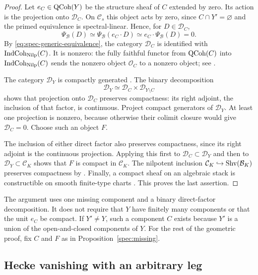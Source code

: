 \begin{proof}
Let $e_C\in\operatorname{QCoh}(Y)$ be the structure sheaf of $C$ extended by zero.
Its action is the projection onto $\mathcal D_C$.  On $\mathcal C_s$ this
object acts by zero, since $C\cap Y'=\varnothing$ and the primed equivalence
is spectral-linear.  Hence, for $D\in\mathcal D_C$,
\[
 \Psi_{\mathcal B}(D)
 \simeq\Psi_{\mathcal B}(e_C\cdot D)
 \simeq e_C\cdot\Psi_{\mathcal B}(D)=0.
\]
By \eqref{eq:spec-generic-equivalence}, the category $\mathcal D_C$ is
identified with $\operatorname{IndCoh}_{\operatorname{Nilp}}(C)$.  It is nonzero: the fully faithful
functor from $\operatorname{QCoh}(C)$ into $\operatorname{IndCoh}_{\operatorname{Nilp}}(C)$ sends the nonzero object
$\mathcal O_C$ to a nonzero object; see \cite[\S\S1.3.1--1.3.4]{GR}.

The category $\mathcal D_Y$ is compactly generated
\cite[\S3.1.7]{GR}.  The binary decomposition
\[
 \mathcal D_Y\simeq\mathcal D_C\times\mathcal D_{Y\setminus C}
\]
shows that projection onto $\mathcal D_C$ preserves compactness: its right
adjoint, the inclusion of that factor, is continuous.  Project compact
generators of $\mathcal D_Y$.  At least one projection is nonzero, because
otherwise their colimit closure would give $\mathcal D_C=0$.  Choose such
an object $F$.

The inclusion of either direct factor also preserves compactness, since
its right adjoint is the continuous projection.  Applying this first to
$\mathcal D_C\subset\mathcal D_Y$ and then to
$\mathcal D_Y\subset\mathcal C_K$ shows that $F$ is compact in
$\mathcal C_K$.  The nilpotent inclusion
$\mathcal C_K\hookrightarrow\operatorname{Shv}(\mathcal B_K)$ preserves compactness by
\cite[Theorem~1.1.7]{GR}.  Finally, a compact sheaf on an algebraic stack
is constructible on smooth finite-type charts
\cite[\S F.2.2]{AGKRRV}.  This proves the last assertion.
\end{proof}

The argument uses one missing component and a binary direct-factor
decomposition.  It does not require that $Y$ have finitely many components
or that the unit $e_C$ be compact.  If $Y'\ne Y$, such a component $C$
exists because $Y'$ is a union of the open-and-closed components of $Y$.
For the rest of the geometric proof, fix $C$ and $F$ as in
Proposition~\ref{spec:missing}.

\subsection{Hecke vanishing with an arbitrary leg}

